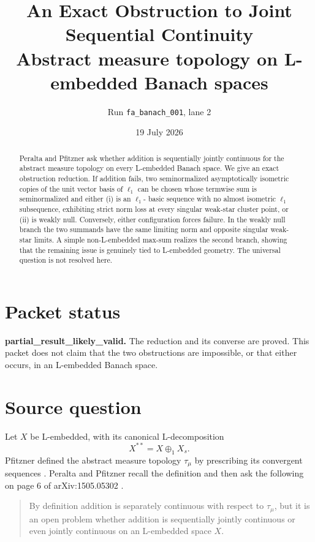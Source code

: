 \documentclass[11pt]{article}
\title{\textbf{An Exact Obstruction to Joint Sequential Continuity}\\
\large Abstract measure topology on L-embedded Banach spaces}
\author{Run \texttt{fa\_banach\_001}, lane 2}
\date{19 July 2026}
\theoremstyle{definition}
\theoremstyle{remark}
\newcommand{\ellone}{\ell_1}
\newcommand{\taumu}{\tau_\mu}
\begin{document}
\maketitle

\begin{abstract}
Peralta and Pfitzner ask whether addition is sequentially jointly continuous
for the abstract measure topology on every L-embedded Banach space.  We give
an exact obstruction reduction.  If addition fails, two seminormalized
asymptotically isometric copies of the unit vector basis of $\ellone$ can be
chosen whose termwise sum is seminormalized and either (i) is an $\ellone$-
basic sequence with no almost isometric $\ellone$ subsequence, exhibiting
strict norm loss at every singular weak-star cluster point, or (ii) is weakly
null.  Conversely, either configuration forces failure.  In the weakly null
branch the two summands have the same limiting norm and opposite singular
weak-star limits.  A simple non-L-embedded max-sum realizes the second branch,
showing that the remaining issue is genuinely tied to L-embedded geometry.
The universal question is not resolved here.
\end{abstract}

\section*{Packet status}

\textbf{partial\_result\_likely\_valid.}  The reduction and its converse are
proved.  This packet does not claim that the two obstructions are impossible,
or that either occurs, in an L-embedded Banach space.

\tableofcontents

\section{Source question}

Let $X$ be L-embedded, with its canonical L-decomposition
\[
             X^{**}=X\oplus_1 X_s.
\]
Pfitzner defined the abstract measure topology $\taumu$ by prescribing its
convergent sequences \cite{Pfitzner}.  Peralta and Pfitzner recall the
definition and then ask the following on page 6 of arXiv:1505.05302
\cite{PeraltaPfitzner}.

\begin{quote}
By definition addition is separately continuous with respect to $\taumu$,
but it is an open problem whether addition is sequentially jointly continuous
or even jointly continuous on an L-embedded space $X$.
\end{quote}
\end{document}
